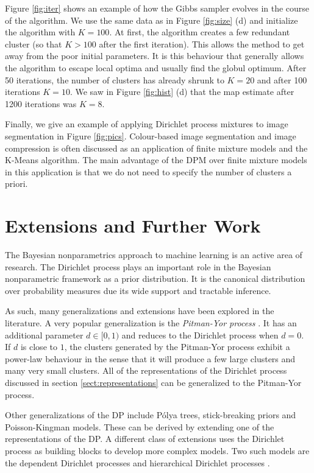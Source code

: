\documentclass[final,3p,times,twocolumn]{elsarticle}
\begin{document}
Figure \ref{fig:iter} shows an example of how the Gibbs sampler evolves in the course of the algorithm.
We use the same data as in Figure \ref{fig:size} (d) and initialize the algorithm with $K=100$.
At first, the algorithm creates a few redundant cluster (so that $K>100$ after the first iteration).
This allows the method to get away from the poor initial parameters.
It is this behaviour that generally allows the algorithm to escape local optima and usually find the globul optimum.
After 50 iterations, the number of clusters has already shrunk to $K=20$ and after 100 iterations $K=10$.
We saw in Figure \ref{fig:hist} (d) that the map estimate after 1200 iterations was $K=8$.

Finally, we give an example of applying Dirichlet process mixtures to image segmentation in Figure \ref{fig:pics}.
Colour-based image segmentation and image compression is often discussed as an application of finite mixture models and the K-Means algorithm.
The main advantage of the DPM over finite mixture models in this application is that we do not need to specify the number of clusters a priori.

\section{Extensions and Further Work}
\label{sect:conclusion}
The Bayesian nonparametrics approach to machine learning is an active area of research.
The Dirichlet process plays an important role in the Bayesian nonparametric framework as a prior distribution.
It is the canonical distribution over probability measures due its wide support and tractable inference.

As such, many generalizations and extensions have been explored in the literature.
A very popular generalization is the \emph{Pitman-Yor process} \cite{pitman1997,teh2006a}.
It has an additional parameter $d \in [0,1)$ and reduces to the Dirichlet process when $d=0$.
If $d$ is close to $1$, the clusters generated by the Pitman-Yor process exhibit a power-law behaviour in the sense that it will produce a few large clusters and many very small clusters.
All of the representations of the Dirichlet process discussed in section \ref{sect:representations} can be generalized to the Pitman-Yor process.

Other generalizations of the DP include P\'olya trees, stick-breaking priors and Poisson-Kingman models.
These can be derived by extending one of the representations of the DP.
A different class of extensions uses the Dirichlet process as building blocks to develop more complex models.
Two such models are the dependent Dirichlet processes \cite{maceachern1999} and hierarchical Dirichlet processes \cite{teh2006b}. 
\end{document}
